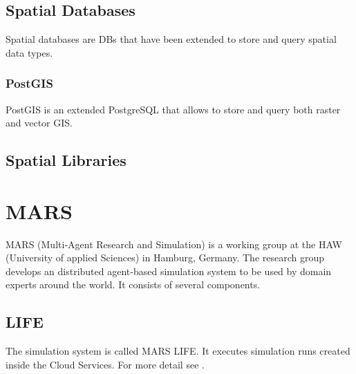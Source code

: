 \subsection{Spatial Databases}
Spatial databases are DBs that have been extended to store and query spatial data types.

\subsubsection{PostGIS}
PostGIS \citep{Obe2011} is an extended PostgreSQL that allows to store and query both raster and vector GIS.

\subsection{Spatial Libraries}



\section{MARS}
MARS (Multi-Agent Research and Simulation) is a working group at the HAW (University of applied Sciences) in Hamburg, Germany. The research group develops an distributed agent-based simulation system to be used by domain experts around the world. It consists of several components.


\subsection{LIFE}
The simulation system is called MARS LIFE. It executes simulation runs created inside the Cloud Services. For more detail see \cite{Huning2016}.


%
%


%
%
%
